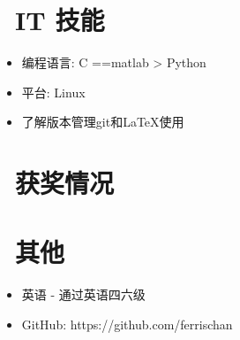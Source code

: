 \documentclass{resume}
\begin{document}

\section{\faCogs\ IT 技能}
\begin{itemize}[parsep=0.5ex]
  \item 编程语言: C ==matlab > Python 
  \item 平台: Linux
  \item 了解版本管理git和LaTeX使用
\end{itemize}

\section{\faHeartO\ 获奖情况}

\section{\faInfo\ 其他}
\begin{itemize}[parsep=0.5ex]
  \item 英语 - 通过英语四六级
  \item GitHub: https://github.com/ferrischan

\end{itemize}

%
%
\end{document}
